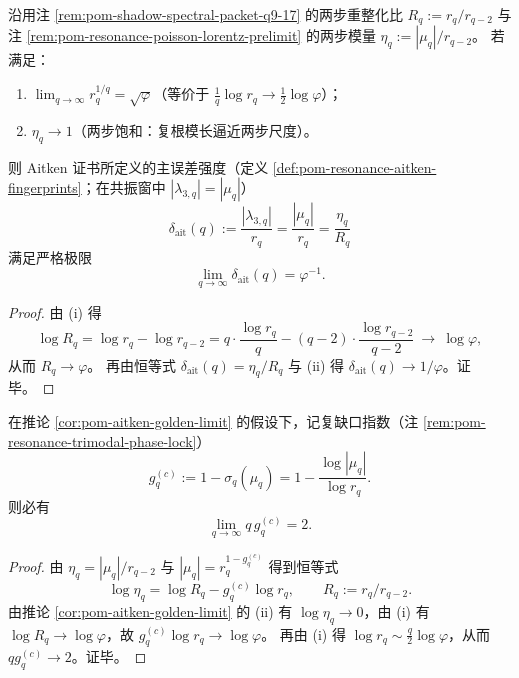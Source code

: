 \begin{corollary}\label{cor:pom-aitken-golden-limit}
沿用注 \ref{rem:pom-shadow-spectral-packet-q9-17} 的两步重整化比 \(R_q:=r_q/r_{q-2}\) 与注 \ref{rem:pom-resonance-poisson-lorentz-prelimit} 的两步模量
\(
\eta_q:=|\mu_q|/r_{q-2}
\)。
若满足：
\begin{enumerate}
  \item[(i)] \(\lim_{q\to\infty} r_q^{1/q}=\sqrt{\varphi}\)（等价于 \(\frac{1}{q}\log r_q\to \tfrac12\log\varphi\)）；
  \item[(ii)] \(\eta_q\to 1\)（两步饱和：复根模长逼近两步尺度）。
\end{enumerate}
则 Aitken 证书所定义的主误差强度（定义 \ref{def:pom-resonance-aitken-fingerprints}；在共振窗中 \(|\lambda_{3,q}|=|\mu_q|\)）
\[
\delta_{\mathrm{ait}}(q):=\frac{|\lambda_{3,q}|}{r_q}=\frac{|\mu_q|}{r_q}=\frac{\eta_q}{R_q}
\]
满足严格极限
\[
\lim_{q\to\infty}\delta_{\mathrm{ait}}(q)=\varphi^{-1}.
\]
\end{corollary}
\begin{proof}
由 (i) 得
\[
\log R_q=\log r_q-\log r_{q-2}
=q\cdot\frac{\log r_q}{q}-(q-2)\cdot\frac{\log r_{q-2}}{q-2}\ \longrightarrow\ \log\varphi,
\]
从而 \(R_q\to\varphi\)。
再由恒等式 \(\delta_{\mathrm{ait}}(q)=\eta_q/R_q\) 与 (ii) 得 \(\delta_{\mathrm{ait}}(q)\to 1/\varphi\)。证毕。
\end{proof}

\begin{corollary}[共振饱和 \texorpdfstring{$\Rightarrow$}{=>} 复缺口指数的 \texorpdfstring{$2/q$}{2/q} 标度律]\label{cor:pom-resonance-complex-gap-2overq}
在推论 \ref{cor:pom-aitken-golden-limit} 的假设下，记复缺口指数（注 \ref{rem:pom-resonance-trimodal-phase-lock}）
\[
g_q^{(c)}:=1-\sigma_q(\mu_q)=1-\frac{\log|\mu_q|}{\log r_q}.
\]
则必有
\[
\lim_{q\to\infty}q\,g_q^{(c)}=2.
\]
\end{corollary}
\begin{proof}
由 \(\eta_q=|\mu_q|/r_{q-2}\) 与 \(|\mu_q|=r_q^{1-g_q^{(c)}}\) 得到恒等式
\[
\log\eta_q=\log R_q-g_q^{(c)}\log r_q,
\qquad R_q:=r_q/r_{q-2}.
\]
由推论 \ref{cor:pom-aitken-golden-limit} 的 (ii) 有 \(\log\eta_q\to 0\)，由 (i) 有 \(\log R_q\to\log\varphi\)，故
\(
g_q^{(c)}\log r_q\to\log\varphi
\)。
再由 (i) 得 \(\log r_q\sim \frac{q}{2}\log\varphi\)，从而 \(qg_q^{(c)}\to 2\)。证毕。
\end{proof}

